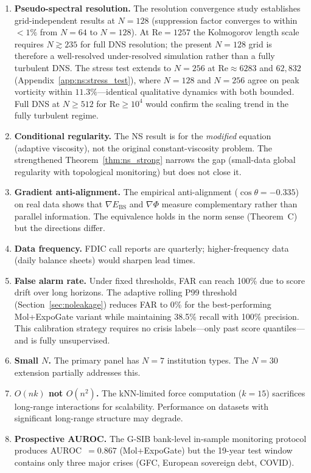 \documentclass[final]{siamltex}
\providecommand{\grad}{\nabla}
\newcommand{\Ebs}{E_{\mathrm{BS}}}
\newcommand{\costheta}{\cos\theta}
\begin{document}
\begin{enumerate}
\item \textbf{Pseudo-spectral resolution.} The resolution
  convergence study establishes grid-independent results at
  $N=128$ (suppression factor converges to within $<1\%$ from
  $N=64$ to $N=128$).  At $\mathrm{Re}=1257$ the Kolmogorov length
  scale requires $N\gtrsim 235$ for full DNS resolution; the
  present $N=128$ grid is therefore a well-resolved
  under-resolved simulation rather than a fully turbulent DNS.
  The stress test extends to $N=256$ at $\mathrm{Re}\approx
  6283$ and $62{,}832$ (Appendix~\ref{app:ns:stress_test}),
  where $N=128$ and $N=256$ agree on peak vorticity within
  $11.3\%$---identical qualitative dynamics with both bounded.
  Full DNS at $N \ge 512$ for $\mathrm{Re} \ge 10^4$
  would confirm the scaling trend in the fully turbulent regime.

\item \textbf{Conditional regularity.} The NS result is for the
  \emph{modified} equation (adaptive viscosity), not the original
  constant-viscosity problem.  The strengthened
  Theorem~\ref{thm:ns_strong} narrows the gap (small-data global
  regularity with topological monitoring) but does not close it.

\item \textbf{Gradient anti-alignment.} The empirical anti-alignment
  ($\costheta=-0.335$) on real data shows that $\grad\Ebs$ and
  $\grad\Phi$ measure complementary rather than parallel information.
  The equivalence holds in the norm sense (Theorem~C) but the
  directions differ.

\item \textbf{Data frequency.} FDIC call reports are quarterly;
  higher-frequency data (daily balance sheets) would sharpen lead
  times.

\item \textbf{False alarm rate.} Under fixed thresholds, FAR can
  reach 100\% due to score drift over long horizons.  The adaptive
  rolling P99 threshold (Section~\ref{sec:noleakage}) reduces FAR
  to 0\% for the best-performing Mol+ExpoGate variant while
  maintaining 38.5\% recall with 100\% precision.  This calibration
  strategy requires no crisis labels---only past score
  quantiles---and is fully unsupervised.

\item \textbf{Small $N$.} The primary panel has $N=7$ institution
  types. The $N=30$ extension partially addresses this.

\item \textbf{$O(nk)$ not $O(n^2)$.} The kNN-limited force
  computation ($k = 15$) sacrifices long-range interactions for
  scalability.  Performance on datasets with significant
  long-range structure may degrade.

\item \textbf{Prospective AUROC.} The G-SIB bank-level in-sample
  monitoring protocol produces AUROC~$= 0.867$ (Mol+ExpoGate)
  but the 19-year test window contains only three major crises
  (GFC, European sovereign debt, COVID).
\end{enumerate}
\end{document}

